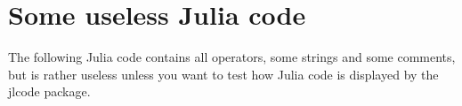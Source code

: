 \documentclass[11pt, a4paper]{scrartcl}
\begin{document}
\section{Some useless Julia code}
The following Julia code contains all operators, some strings and some comments,
but is rather useless unless you want to test how Julia code is displayed by the
jlcode package.


\end{document}
